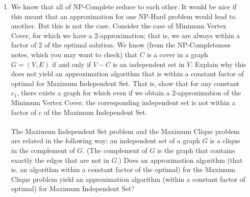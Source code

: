 \documentclass[tikz, 12pt]{scrartcl}
\begin{document}
\begin{enumerate}
	\item We know that all of NP-Complete reduce to each other. It would be nice if this meant that an approximation for one NP-Hard problem would lead to another. But this is not the case. Consider the case of Minimum Vertex Cover, for which we have a 2-approximation; that is, we are always within a factor of 2 of the optimal solution. We know (from the NP-Completeness notes, which you may want to check) that $C$ is a cover in a graph $G = (V, E)$ if and only if $V - C$ is an independent set in $V$. Explain why this does not yield an approximation algorithm that is within a constant factor of optimal for Maximum Independent Set. That is, show that for any constant $c_1$, there exists a graph for which even if we obtain a 2-approximation of the Minimum Vertex Cover, the corresponding independent set is not within a factor of $c$ of the Maximum Independent Set.\\
	\\
	The Maximum Independent Set problem and the Maximum Clique problem are related in the following way: an independent set of a graph $G$ is a clique in the complement of $G$. (The complement of $G$ is the graph that contains exactly the edges that are not in $G$.) Does an approximation algorithm (that is, an algorithm within a constant factor of the optimal) for the Maximum Clique problem yield an approximation algorithm (within a constant factor of optimal) for Maximum Independent Set?
	

\end{enumerate}
\end{document}
